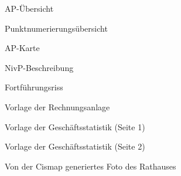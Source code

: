 \begin{figure}[htbp]
	\centering
	\caption[]{AP-Übersicht}
	\label{fig:ap-uebersicht}
\end{figure}
\begin{figure}[htbp]
	\centering
	\caption[]{Punktnumerierungsübersicht}
	\label{fig:punktnumerierungsuebersicht}
\end{figure}
\begin{figure}[htbp]
	\centering
	\caption[]{AP-Karte}
	\label{fig:ap-karte}
\end{figure}
\begin{figure}[htbp]
	\centering
	\caption[]{NivP-Beschreibung}
	\label{fig:nivp-beschreibung}
\end{figure}
\begin{figure}[htbp]
	\centering
	\caption[]{Fortführungsriss}
	\label{fig:fortfuehrungsriss}
\end{figure}
\begin{figure}[htbp]
	\centering
	\caption[]{Vorlage der Rechnungsanlage}
	\label{fig:vorlage_rechnungsanlage}
\end{figure}
\begin{figure}[htbp]
	\centering
	\caption[]{Vorlage der Geschäftsstatistik (Seite 1)}
	\label{fig:vorlage_geschaeftsstatistik_1}
\end{figure}
\begin{figure}[htbp]
	\centering
	\caption[]{Vorlage der Geschäftsstatistik (Seite 2)}
	\label{fig:vorlage_geschaeftsstatistik_2}
\end{figure}
\begin{figure}[htbp]
	\centering
	\caption[]{Von der Cismap generiertes Foto des Rathauses}
	\label{fig:cismap-rathaus}
\end{figure}



